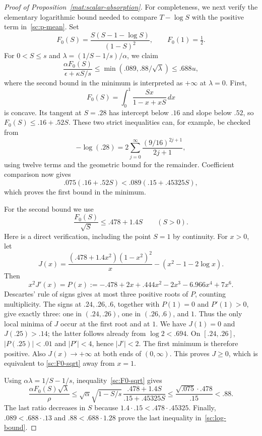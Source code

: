 \documentclass[11pt]{article}
\theoremstyle{definition}
\theoremstyle{remark}
\numberwithin{equation}{section}
\begin{document}
\begin{proof}[Proof of Proposition~\ref{mat:scalar-absorption}]
For completeness, we next verify the elementary logarithmic bound needed
to compare $T-\log S$ with the positive term in~\eqref{sc:p-mean}.
Set
\[
 F_0(S)=\frac{S(S-1-\log S)}{(1-S)^2},\qquad F_0(1)=\tfrac12.
\]
For $0<S\le s$ and $\lambda=(1/S-1/s)/\alpha$, we claim
\begin{equation}\label{sc:log-bound}
 \frac{\alpha F_0(S)}{\epsilon+\kappa S/s}
 \le\min(.089,.88/\sqrt\lambda)\le .688u,
\end{equation}
where the second bound in the minimum is interpreted as $+\infty$ at
$\lambda=0$.  First,
\[
 F_0(S)=\int_0^1 \frac{Sx}{1-x+xS}\,dx
\]
is concave.  Its tangent at $S=.28$ has intercept below $.16$ and slope
below $.52$, so $F_0(S)\le .16+.52S$.  These two strict inequalities
can, for example, be checked from
\[
 -\log(.28)=2\sum_{j=0}^{\infty}\frac{(9/16)^{2j+1}}{2j+1},
\]
using twelve terms and the geometric bound for the remainder.
Coefficient comparison now gives
\[
 .075(.16+.52S)<.089(.15+.45325S),
\]
which proves the first bound in the minimum.

For the second bound we use
\begin{equation}\label{sc:F0-sqrt}
 \frac{F_0(S)}{\sqrt S}\le .478+1.4S\qquad(S>0).
\end{equation}
Here is a direct verification, including the point $S=1$ by continuity.
For $x>0$, let
\[
 J(x)=\frac{(.478+1.4x^2)(1-x^2)^2}{x}
       -(x^2-1-2\log x).
\]
Then
\[
 x^2J'(x)=P(x):=-.478+2x+.444x^2-2x^3-6.966x^4+7x^6.
\]
Descartes' rule of signs gives at most three positive roots of $P$,
counting multiplicity.  The signs at $.24,.26,.6$, together with
$P(1)=0$ and $P'(1)>0$, give exactly three: one in $(.24,.26)$, one in
$(.26,.6)$, and $1$.  Thus the only local minima of $J$ occur at the
first root and at $1$.  We have $J(1)=0$ and $J(.25)>.14$; the latter
follows already from $\log2<.694$.  On $[.24,.26]$,
$|P(.25)|<.01$ and $|P'|<4$, hence $|J'|<2$.
The first minimum is therefore positive.  Also $J(x)\to+\infty$ at
both ends of $(0,\infty)$.  This proves $J\ge0$, which is equivalent to
\eqref{sc:F0-sqrt} away from $x=1$.

Using $\alpha\lambda=1/S-1/s$, inequality~\eqref{sc:F0-sqrt} gives
\[
 \frac{\alpha F_0(S)\sqrt\lambda}{\rho}
 \le \sqrt\alpha\sqrt{1-S/s}\,
       \frac{.478+1.4S}{.15+.45325S}
 \le \frac{\sqrt{.075}\cdot .478}{.15}<.88.
\]
The last ratio decreases in $S$ because
$1.4\cdot.15<.478\cdot.45325$.  Finally,
$.089<.688\cdot.13$ and $.88<.688\cdot1.28$ prove the last inequality
in~\eqref{sc:log-bound}.


\end{proof}
\end{document}
